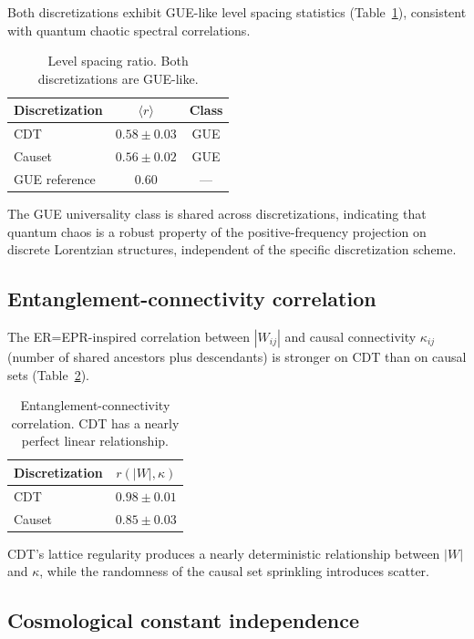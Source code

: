 \documentclass[aps,prd,twocolumn,superscriptaddress,nofootinbib]{revtex4-2}
\begin{document}
Both discretizations exhibit GUE-like level spacing statistics (Table~\ref{tab:lsr}), consistent with quantum chaotic spectral correlations.

\begin{table}[h]
\centering
\begin{tabular}{lcc}
\toprule
Discretization & $\langle r \rangle$ & Class \\
\midrule
CDT & $0.58 \pm 0.03$ & GUE \\
Causet & $0.56 \pm 0.02$ & GUE \\
GUE reference & 0.60 & --- \\
\bottomrule
\end{tabular}
\caption{Level spacing ratio. Both discretizations are GUE-like.}
\label{tab:lsr}
\end{table}

The GUE universality class is shared across discretizations, indicating that quantum chaos is a robust property of the positive-frequency projection on discrete Lorentzian structures, independent of the specific discretization scheme.

\subsection{Entanglement-connectivity correlation}

The ER=EPR-inspired correlation between $|W_{ij}|$ and causal connectivity $\kappa_{ij}$ (number of shared ancestors plus descendants) is stronger on CDT than on causal sets (Table~\ref{tab:epr}).

\begin{table}[h]
\centering
\begin{tabular}{lc}
\toprule
Discretization & $r(|W|, \kappa)$ \\
\midrule
CDT & $0.98 \pm 0.01$ \\
Causet & $0.85 \pm 0.03$ \\
\bottomrule
\end{tabular}
\caption{Entanglement-connectivity correlation. CDT has a nearly perfect linear relationship.}
\label{tab:epr}
\end{table}

CDT's lattice regularity produces a nearly deterministic relationship between $|W|$ and $\kappa$, while the randomness of the causal set sprinkling introduces scatter.

\subsection{Cosmological constant independence}
\end{document}
